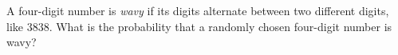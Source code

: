A four-digit number is \emph{wavy} if its digits alternate between two different digits, like $3838$. What is the probability that a randomly chosen four-digit number is wavy?
